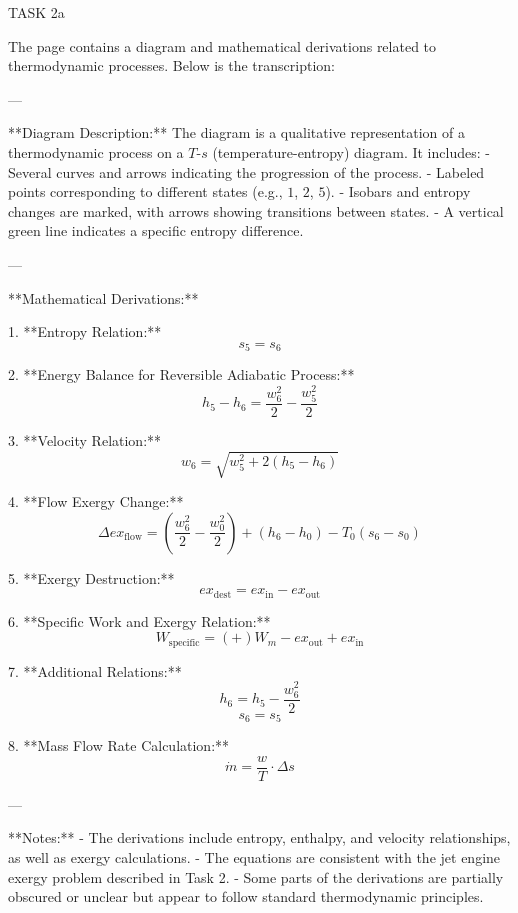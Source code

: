 TASK 2a

The page contains a diagram and mathematical derivations related to thermodynamic processes. Below is the transcription:

---

**Diagram Description:**
The diagram is a qualitative representation of a thermodynamic process on a \( T \)-\( s \) (temperature-entropy) diagram. It includes:
- Several curves and arrows indicating the progression of the process.
- Labeled points corresponding to different states (e.g., \( 1 \), \( 2 \), \( 5 \)).
- Isobars and entropy changes are marked, with arrows showing transitions between states.
- A vertical green line indicates a specific entropy difference.

---

**Mathematical Derivations:**

1. **Entropy Relation:**
   \[
   s_5 = s_6
   \]

2. **Energy Balance for Reversible Adiabatic Process:**
   \[
   h_5 - h_6 = \frac{w_6^2}{2} - \frac{w_5^2}{2}
   \]

3. **Velocity Relation:**
   \[
   w_6 = \sqrt{w_5^2 + 2(h_5 - h_6)}
   \]

4. **Flow Exergy Change:**
   \[
   \Delta ex_{\text{flow}} = \left( \frac{w_6^2}{2} - \frac{w_0^2}{2} \right) + (h_6 - h_0) - T_0(s_6 - s_0)
   \]

5. **Exergy Destruction:**
   \[
   ex_{\text{dest}} = ex_{\text{in}} - ex_{\text{out}}
   \]

6. **Specific Work and Exergy Relation:**
   \[
   W_{\text{specific}} = (+) W_m - ex_{\text{out}} + ex_{\text{in}}
   \]

7. **Additional Relations:**
   \[
   h_6 = h_5 - \frac{w_6^2}{2}
   \]
   \[
   s_6 = s_5
   \]

8. **Mass Flow Rate Calculation:**
   \[
   \dot{m} = \frac{w}{T} \cdot \Delta s
   \]

---

**Notes:**
- The derivations include entropy, enthalpy, and velocity relationships, as well as exergy calculations.
- The equations are consistent with the jet engine exergy problem described in Task 2.
- Some parts of the derivations are partially obscured or unclear but appear to follow standard thermodynamic principles.

